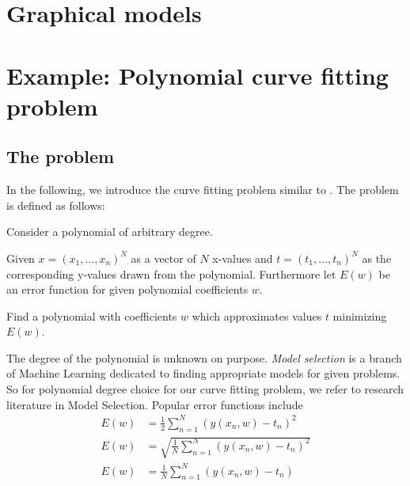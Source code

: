 \section{Graphical models}
\label{sec:bp-graphical-models}
%

\section{Example: Polynomial curve fitting problem}
\label{sec:bp-curve-fitting}
%
\subsection{The problem}
%

In the following, we introduce the curve fitting problem similar to \cite[p.~4~ff.]{Bishop}.
The problem is defined as follows:

\begin{problem}
  Consider a polynomial of arbitrary degree.

  \begin{description}
  \item{Given}
  $x = (x_1, \ldots, x_n)^N$ as a vector of $N$ x-values and
  $t = (t_1, \ldots, t_n)^N$ as the corresponding y-values drawn from the polynomial.
  Furthermore let $E(w)$ be an error function for given polynomial coefficients $w$.

  \item{Find}
  a polynomial with coefficients $w$ which approximates values $t$ minimizing $E(w)$.
  \end{description}
\end{problem}

The degree of the polynomial is unknown on purpose.
\emph{Model selection} is a branch of Machine Learning dedicated to finding appropriate models for given problems.
So for polynomial degree choice for our curve fitting problem, we refer to research literature in Model Selection. 
Popular error functions include
\begin{align}
  E(w) &= \frac12 \sum_{n=1}^N \left(y(x_n, w) - t_n\right)^2 \tag{Mean squared error, MSE} \\
  E(w) &= \sqrt{\frac{1}{N} \sum_{n=1}^N (y(x_n, w) - t_n)^2} \tag{Root mean square, RMS} \\
  E(w) &= \frac1N \sum_{n=1}^N (y(x_n, w) - t_n)              \tag{Mean signed deviation, MSD}
\end{align}

